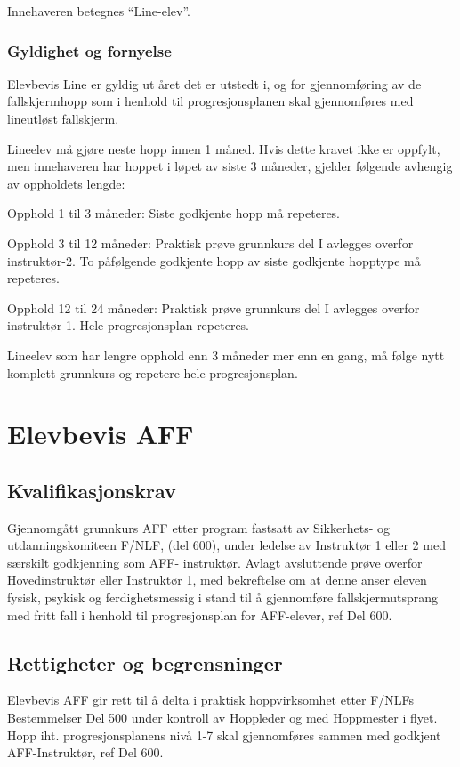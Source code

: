 Innehaveren betegnes ``Line-elev''.

\subsubsection{Gyldighet og fornyelse}
Elevbevis Line er gyldig ut året det er utstedt i, og for gjennomføring av de fallskjermhopp som i henhold til progresjonsplanen skal gjennomføres med lineutløst fallskjerm.

Lineelev må gjøre neste hopp innen 1 måned. Hvis dette kravet ikke er oppfylt, men innehaveren har hoppet i løpet av siste 3 måneder, gjelder følgende avhengig av oppholdets lengde:

Opphold 1 til 3 måneder: Siste godkjente hopp må repeteres.

Opphold 3 til 12 måneder: Praktisk prøve grunnkurs del I avlegges overfor instruktør-2. To påfølgende godkjente hopp av siste godkjente hopptype må repeteres.

Opphold 12 til 24 måneder: Praktisk prøve grunnkurs del I avlegges overfor instruktør-1. Hele progresjonsplan repeteres.

Lineelev som har lengre opphold enn 3 måneder mer enn en gang, må følge nytt komplett grunnkurs og repetere hele progresjonsplan.

\section{Elevbevis AFF}
\subsection{Kvalifikasjonskrav}
Gjennomgått grunnkurs AFF etter program fastsatt av Sikkerhets- og utdanningskomiteen F/NLF, (del 600), under ledelse av Instruktør 1 eller 2 med særskilt godkjenning som AFF- instruktør. Avlagt avsluttende prøve overfor Hovedinstruktør eller Instruktør 1, med bekreftelse om at denne anser eleven fysisk, psykisk og ferdighetsmessig i stand til å gjennomføre fallskjermutsprang med fritt fall i henhold til progresjonsplan for AFF-elever, ref Del 600.

\subsection{Rettigheter og begrensninger}
Elevbevis AFF gir rett til å delta i praktisk hoppvirksomhet etter F/NLFs Bestemmelser Del 500 under kontroll av Hoppleder og med Hoppmester i flyet. Hopp iht. progresjonsplanens nivå 1-7 skal gjennomføres sammen med godkjent AFF-Instruktør, ref Del 600.

